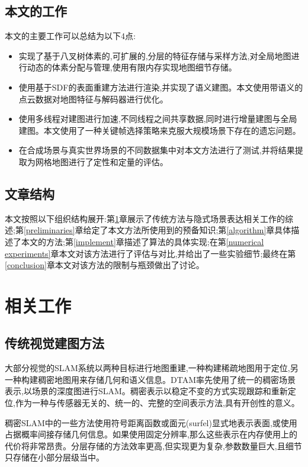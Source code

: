 \subsection{本文的工作}
本文的主要工作可以总结为以下4点:
\begin{itemize}
	\item 实现了基于八叉树体素的,可扩展的,分层的特征存储与采样方法,对全局地图进行动态的体素分配与管理,使用有限内存实现地图细节存储。
	\item 使用基于SDF的表面重建方法进行渲染,并实现了语义建图。本文使用带语义的点云数据对地图特征与解码器进行优化。
	\item 使用多线程对建图进行加速,不同线程之间共享数据,同时进行增量建图与全局建图。本文使用了一种关键帧选择策略来克服大规模场景下存在的遗忘问题。
	\item 在合成场景与真实世界场景的不同数据集中对本文方法进行了测试,并将结果提取为网格地图进行了定性和定量的评估。
\end{itemize}


\subsection{文章结构}
本文按照以下组织结构展开:第\ref{related work}章展示了传统方法与隐式场景表达相关工作的综述;第\ref{preliminaries}章给定了本文方法所使用到的预备知识;第\ref{algorithm}章具体描述了本文的方法;第\ref{implement}章描述了算法的具体实现;在第\ref{numerical experiments}章本文对该方法进行了评估与对比,并给出了一些实验细节;最终在第\ref{conclusion}章本文对该方法的限制与瓶颈做出了讨论。

\clearpage
\section{相关工作}\label{related work}

\subsection{传统视觉建图方法}
大部分视觉的SLAM系统以两种目标进行地图重建,一种构建稀疏地图用于定位,另一种构建稠密地图用来存储几何和语义信息。DTAM\cite{DTAM}率先使用了统一的稠密场景表示,以场景的深度图进行SLAM。稠密表示以稳定不变的方式实现跟踪和重新定位,作为一种与传感器无关的、统一的、完整的空间表示方法,具有开创性的意义。

稠密SLAM中的一些方法使用符号距离函数或面元(surfel)显式地表示表面,或使用占据概率间接存储几何信息。如果使用固定分辨率\cite{tradition1},那么这些表示在内存使用上的代价将非常昂贵。分层存储\cite{tradition2}的方法效率更高,但实现更为复杂,参数数量巨大,且细节只存储在小部分层级当中。

